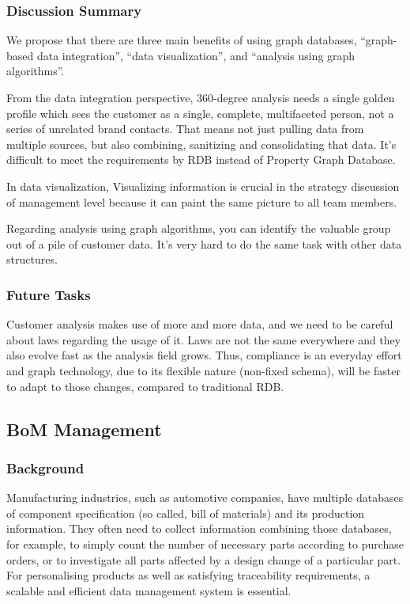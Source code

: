 \documentclass[runningheads]{llncs}
\begin{document}
\subsubsection{Discussion Summary}
We propose that there are three main benefits of using graph databases, “graph-based data integration”, “data visualization”, and “analysis using graph algorithms”.

From the data integration perspective, 360-degree analysis needs a single golden profile which sees the customer as a single, complete, multifaceted person, not a series of unrelated brand contacts. That means not just pulling data from multiple sources, but also combining, sanitizing and consolidating that data. It’s difficult to meet the requirements by RDB instead of Property Graph Database.

In data visualization, Visualizing information is crucial in the strategy discussion of management level because it can paint the same picture to all team members.  

Regarding  analysis using graph algorithms, you can identify the valuable group out of a pile of customer data. It’s very hard to do the same task with other data structures.

\subsubsection{Future Tasks}
Customer analysis makes use of more and more data, and we need to be careful about laws regarding the usage of it. Laws are not the same everywhere and they also evolve fast as the analysis field grows. Thus, compliance is an everyday effort and graph technology, due to its flexible nature (non-fixed schema), will be faster to adapt to those changes, compared to traditional RDB.

\subsection{BoM Management}

\subsubsection{Background}

Manufacturing industries, such as automotive companies, have multiple databases of component specification (so called, bill of materials) and its production information. They often need to collect information combining those databases, for example, to simply count the number of necessary parts according to purchase orders, or to investigate all parts affected by a design change of a particular part. For personalising products as well as satisfying traceability requirements, a scalable and efficient data management system is essential.
\end{document}
